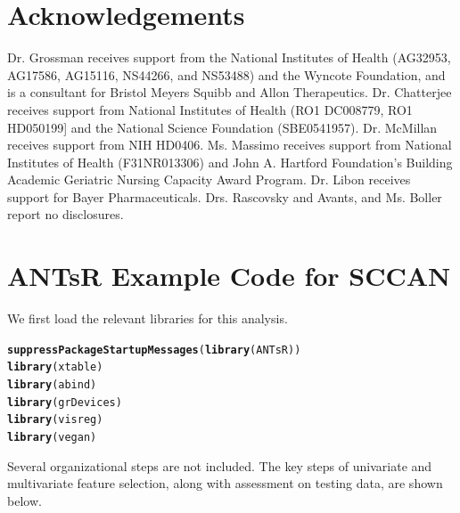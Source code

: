 \documentclass[preprint,authoryear,12pt]{elsarticle}
\makeatletter
\newcommand{\hlfunctioncall}[1]{\textcolor[rgb]{0.501960784313725,0,0.329411764705882}{\textbf{#1}}}%
\newenvironment{kframe}{%
 \def\at@end@of@kframe{}%
 \ifinner\ifhmode%
  \def\at@end@of@kframe{\end{minipage}}%
  \begin{minipage}{\columnwidth}%
 \fi\fi%
 \def\FrameCommand##1{\hskip\@totalleftmargin \hskip-\fboxsep
 \colorbox{shadecolor}{##1}\hskip-\fboxsep
     \hskip-\linewidth \hskip-\@totalleftmargin \hskip\columnwidth}%
 \MakeFramed {\advance\hsize-\width
   \@totalleftmargin\z@ \linewidth\hsize
   \@setminipage}}%
 {\par\unskip\endMakeFramed%
 \at@end@of@kframe}
\newenvironment{knitrout}{}{} %
\makeatother
\begin{document}
\section{Acknowledgements}
Dr. Grossman receives support from the National Institutes of Health (AG32953, AG17586, AG15116, NS44266, and NS53488) and the Wyncote Foundation, and is a consultant for Bristol Meyers Squibb and Allon Therapeutics.  Dr. Chatterjee receives support from National Institutes of Health (RO1 DC008779, RO1 HD050199] and the National Science Foundation (SBE0541957).  Dr. McMillan receives support from NIH HD0406.  Ms. Massimo receives support from National Institutes of Health (F31NR013306) and John A. Hartford Foundation's Building Academic Geriatric Nursing Capacity Award Program.  Dr. Libon receives support for Bayer Pharmaceuticals.  Drs. Rascovsky and Avants, and Ms. Boller report no disclosures.

\section{ANTsR Example Code for SCCAN}

We first load the relevant libraries for this analysis.

\begin{knitrout}
\color{fgcolor}\begin{kframe}
\begin{alltt}
\hlfunctioncall{suppressPackageStartupMessages}(\hlfunctioncall{library}(ANTsR))
\hlfunctioncall{library}(xtable)
\hlfunctioncall{library}(abind)
\hlfunctioncall{library}(grDevices)
\hlfunctioncall{library}(visreg)
\hlfunctioncall{library}(vegan)
\end{alltt}
\end{kframe}
\end{knitrout}


Several organizational steps are not included.  The key steps of univariate and multivariate feature selection, along with assessment on testing data, are shown below. 
\end{document}
